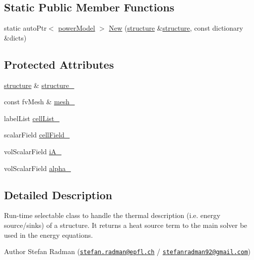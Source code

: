 \subsection*{Static Public Member Functions}
\begin{DoxyCompactItemize}
\item 
static auto\+Ptr$<$ \hyperlink{classFoam_1_1powerModel}{power\+Model} $>$ \hyperlink{classFoam_1_1powerModel_a44b6d57c85ab4b60ffa72ebd8923f14e}{New} (\hyperlink{classFoam_1_1structure}{structure} \&\hyperlink{classFoam_1_1structure}{structure}, const dictionary \&dicts)
\end{DoxyCompactItemize}
\subsection*{Protected Attributes}
\begin{DoxyCompactItemize}
\item 
\hyperlink{classFoam_1_1structure}{structure} \& \hyperlink{classFoam_1_1powerModel_a1969dfe3e1cb5780f79aa7ea41833dd2}{structure\+\_\+}
\item 
const fv\+Mesh \& \hyperlink{classFoam_1_1powerModel_a23edeeeecebcef11921a33dd5d990570}{mesh\+\_\+}
\item 
label\+List \hyperlink{classFoam_1_1powerModel_a28ed5d139c1f6ec0cd6b4f3a8796624a}{cell\+List\+\_\+}
\item 
scalar\+Field \hyperlink{classFoam_1_1powerModel_a3135175815e6b668e27ee0d7017ed87d}{cell\+Field\+\_\+}
\item 
vol\+Scalar\+Field \hyperlink{classFoam_1_1powerModel_a1d034617c55b900bdb73542b21ca2bb1}{i\+A\+\_\+}
\item 
vol\+Scalar\+Field \hyperlink{classFoam_1_1powerModel_afc7f837218ee9a841a3667dbca785455}{alpha\+\_\+}
\end{DoxyCompactItemize}


\subsection{Detailed Description}
Run-\/time selectable class to handle the thermal description (i.\+e. energy source/sinks) of a structure. It returns a heat source term to the main solver be used in the energy equations. 

\label{_Description}%
 Author Stefan Radman (\href{mailto:stefan.radman@epfl.ch}{\tt stefan.\+radman@epfl.\+ch} / \href{mailto:stefanradman92@gmail.com}{\tt stefanradman92@gmail.\+com})

